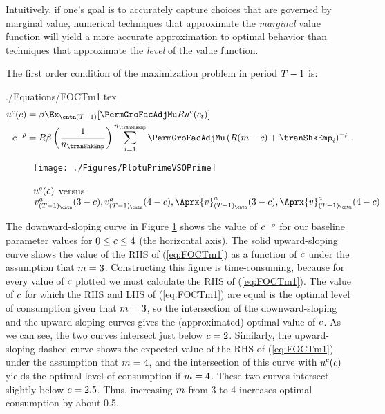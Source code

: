 \documentclass[SolvingMicroDSOPs]{subfiles}
\begin{document}
Intuitively, if one's goal is to accurately capture choices
that are governed by marginal value,
numerical techniques that approximate the \textit{marginal} value
function will yield a more accurate approximation to
optimal behavior than techniques that approximate the \textit{level}
of the value function.

The first order condition of the maximization problem in period $T-1$ is:
\begin{verbatimwrite}{./Equations/FOCTm1.tex}
  \begin{equation}\begin{gathered}\begin{aligned}
        \uFunc^{c}(\cNrm)       & = \DiscFac \Ex_{\cntn(T-1)} [\PermGroFacAdjMu\Rfree \uFunc^{c}(c_{\prdT})]  %
        \\      \cNrm^{-\CRRA}   & = \Rfree \DiscFac \left(\frac{1}{n_{\tranShkEmp}}\right) \sum_{i=1}^{n_{\tranShkEmp}} \PermGroFacAdjMu\left(\Rfree (\mNrm-\cNrm) + \tranShkEmp_{i}\right)^{-\CRRA} \label{eq:FOCTm1}.
      \end{aligned}\end{gathered}\end{equation}
\end{verbatimwrite}
\unskip
\hypertarget{PlotuPrimeVSOPrime}{}
\begin{figure}
  \centerline{\texttt{[image: ./Figures/PlotuPrimeVSOPrime]}}
  \caption{$u^{c}(c)$ versus $\vFunc_{({\trmT-1})_\cntn}^{a}(3-c), \vFunc_{({\trmT-1})_\cntn}^{a}(4-c), \Aprx{\vFunc}_{({\trmT-1})_\cntn}^{a}(3-c), \Aprx{\vFunc}_{({\trmT-1})_\cntn}^{a}(4-c)$}
  \label{fig:PlotuPrimeVSOPrime}
\end{figure}



The downward-sloping curve in Figure \ref{fig:PlotuPrimeVSOPrime}
shows the value of $c^{-\rho}$ for our baseline parameter values
for $0 \leq c \leq 4$ (the horizontal axis).  The solid
upward-sloping curve shows the value of the RHS of (\ref{eq:FOCTm1})
as a function of $c$ under the assumption that $m=3$.
Constructing this figure is time-consuming, because for every
value of $c$ plotted we must calculate the RHS of
(\ref{eq:FOCTm1}).  The value of $c$ for which the RHS and LHS
of (\ref{eq:FOCTm1}) are equal is the optimal level of consumption
given that $m=3$, so the intersection of the downward-sloping
and the upward-sloping curves gives the (approximated) optimal value of $c$.
As we can see, the two curves intersect just below $c=2$.
Similarly, the upward-sloping dashed curve shows the expected value
of the RHS of (\ref{eq:FOCTm1}) under the assumption that $m=4$,
and the intersection of this curve with $u^{c}(c)$ yields the
optimal level of consumption if $m=4$.  These two curves
intersect slightly below $c=2.5$.  Thus, increasing $m$
from 3 to 4 increases optimal consumption by about 0.5.
\end{document}
